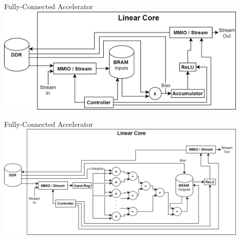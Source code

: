 \begin{frame}{Fully-Connected Accelerator}
	\centering
	\includegraphics[width=0.9\textwidth]{../Images/Platform/Linear_core_serial.png}\\
\end{frame}

\begin{frame}{Fully-Connected Accelerator}
	\centering
	\includegraphics[width=0.9\textwidth]{../Images/Platform/Linear_core_partial_outputs.png}\\
\end{frame}
